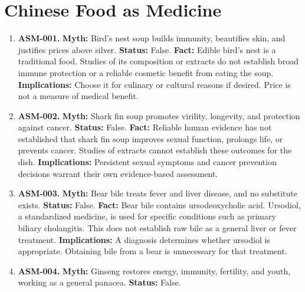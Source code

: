 \documentclass[11pt,oneside]{book}
\begin{document}
\section{Chinese Food as Medicine}
\begin{enumerate}[leftmargin=0pt,labelwidth=0pt,labelsep=0pt,itemindent=0pt]
\item[] \textbf{ASM-001.} \textbf{Myth:} Bird's nest soup builds immunity, beautifies skin, and justifies prices above silver.\newline
\textbf{Status:} False.\newline
\textbf{Fact:} Edible bird's nest is a traditional food. Studies of its composition or extracts do not establish broad immune protection or a reliable cosmetic benefit from eating the soup. \cite{ref138,ref475}\newline
\textbf{Implications:} Choose it for culinary or cultural reasons if desired. Price is not a measure of medical benefit.
\item[] \textbf{ASM-002.} \textbf{Myth:} Shark fin soup promotes virility, longevity, and protection against cancer.\newline
\textbf{Status:} False.\newline
\textbf{Fact:} Reliable human evidence has not established that shark fin soup improves sexual function, prolongs life, or prevents cancer. Studies of extracts cannot establish these outcomes for the dish. \cite{ref476}\newline
\textbf{Implications:} Persistent sexual symptoms and cancer prevention decisions warrant their own evidence-based assessment.
\item[] \textbf{ASM-003.} \textbf{Myth:} Bear bile treats fever and liver disease, and no substitute exists.\newline
\textbf{Status:} False.\newline
\textbf{Fact:} Bear bile contains ursodeoxycholic acid. Ursodiol, a standardized medicine, is used for specific conditions such as primary biliary cholangitis. This does not establish raw bile as a general liver or fever treatment. \cite{ref140,ref477}\newline
\textbf{Implications:} A diagnosis determines whether ursodiol is appropriate. Obtaining bile from a bear is unnecessary for that treatment.
\item[] \textbf{ASM-004.} \textbf{Myth:} Ginseng restores energy, immunity, fertility, and youth, working as a general panacea.\newline
\textbf{Status:} False.\newline

\end{enumerate}
\end{document}
